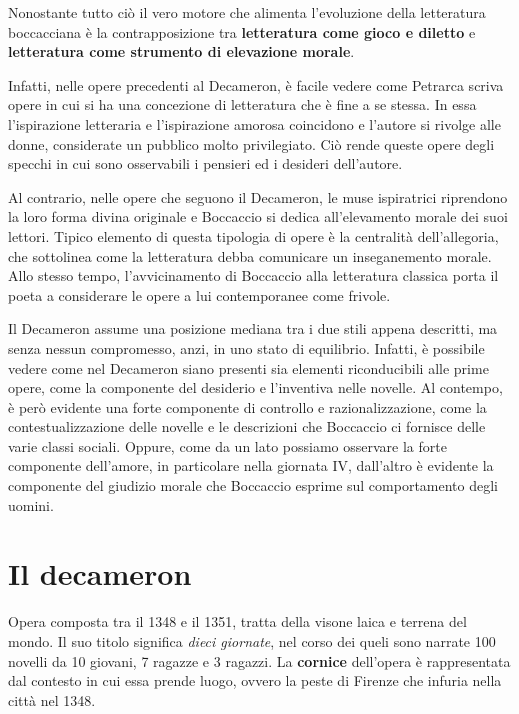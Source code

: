 \documentclass[10pt,a4paper]{article}
\begin{document}
		Nonostante tutto ciò il vero motore che alimenta l'evoluzione della letteratura boccacciana è la contrapposizione tra \textbf{letteratura come gioco e diletto} e \textbf{letteratura come strumento di elevazione morale}.

		Infatti, nelle opere precedenti al Decameron, è facile vedere come Petrarca scriva opere in cui si ha una concezione di letteratura che è fine a se stessa. In essa l'ispirazione letteraria e l'ispirazione amorosa coincidono e l'autore si rivolge alle donne, considerate un pubblico molto privilegiato. Ciò rende queste opere degli specchi in cui sono osservabili i pensieri ed i desideri dell'autore.

		Al contrario, nelle opere che seguono il Decameron, le muse ispiratrici riprendono la loro forma divina originale e Boccaccio si dedica all'elevamento morale dei suoi lettori. Tipico elemento di questa tipologia di opere è la centralità dell'allegoria, che sottolinea come la letteratura debba comunicare un inseganemento morale. Allo stesso tempo, l'avvicinamento di Boccaccio alla letteratura classica porta il poeta a considerare le opere a lui contemporanee come frivole.

		Il Decameron assume una posizione mediana tra i due stili appena descritti, ma senza nessun compromesso, anzi, in uno stato di equilibrio. Infatti, è possibile vedere come nel Decameron siano presenti sia elementi riconducibili alle prime opere, come la componente del desiderio e l'inventiva nelle novelle. Al contempo, è però evidente una forte componente di controllo e razionalizzazione, come la contestualizzazione delle novelle e le descrizioni che Boccaccio ci fornisce delle varie classi sociali. Oppure, come da un lato possiamo osservare la forte componente dell'amore, in particolare nella giornata IV, dall'altro è evidente la componente del giudizio morale che Boccaccio esprime sul comportamento degli uomini.

	 \section{Il decameron}

	 Opera composta tra il 1348 e il 1351, tratta della visone laica e terrena del mondo. Il suo titolo significa \textit{dieci giornate}, nel corso dei queli sono narrate 100 novelli da 10 giovani, 7 ragazze e 3 ragazzi. La \textbf{cornice} dell'opera è rappresentata dal contesto in cui essa prende luogo, ovvero la peste di Firenze che infuria nella città nel 1348.
\end{document}
